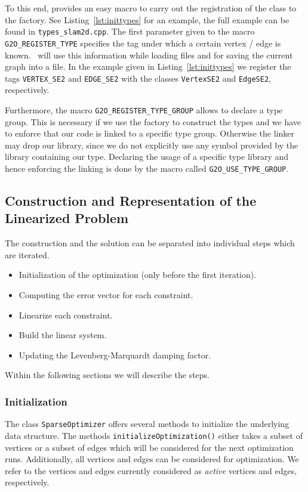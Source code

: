 \documentclass[a4paper]{article}
\begin{document}
To this end, \gopt{} provides an easy macro to carry out the registration of the
class to the factory.  See Listing~\ref{lst:inittypes} for an example,
the full example can be found in \verb+types_slam2d.cpp+.  The first
parameter given to the macro \verb+G2O_REGISTER_TYPE+ specifies the tag
under which a certain vertex / edge is known. \gopt\ will use this
information while loading files and for saving the current graph into a
file. In the example given in Listing~\ref{lst:inittypes} we register
the tags \verb+VERTEX_SE2+ and \verb+EDGE_SE2+ with the classes
\verb+VertexSE2+ and \verb+EdgeSE2+, respectively.

Furthermore, the macro \verb+G2O_REGISTER_TYPE_GROUP+ allows to declare
a type group. This is necessary if we use the factory to construct the
types and we have to enforce that our code is linked to a specific type
group. Otherwise the linker may drop our library, since we do not
explicitly use any symbol provided by the library containing our type.
Declaring the usage of a specific type library and hence enforcing the
linking is done by the macro called \verb+G2O_USE_TYPE_GROUP+.

\subsection{Construction and Representation of the Linearized Problem}
The construction and the solution can be separated into individual
steps which are iterated.
\begin{itemize}
  \item Initialization of the optimization (only before the first
    iteration).
  \item Computing the error vector for each constraint.
  \item Linearize each constraint.
  \item Build the linear system.
  \item Updating the Levenberg-Marquardt damping factor.
\end{itemize}

Within the following sections we will describe the steps.

\subsubsection{Initialization}
The class \verb+SparseOptimizer+ offers several methods to initialize
the underlying data structure. The methods
\verb+initializeOptimization()+ either takes a subset of vertices or a
subset of edges which will be considered for the next optimization runs.
Additionally, all vertices and edges can be considered for optimization.
We refer to the vertices and edges currently considered as \emph{active}
vertices and edges, respectively.
\end{document}
